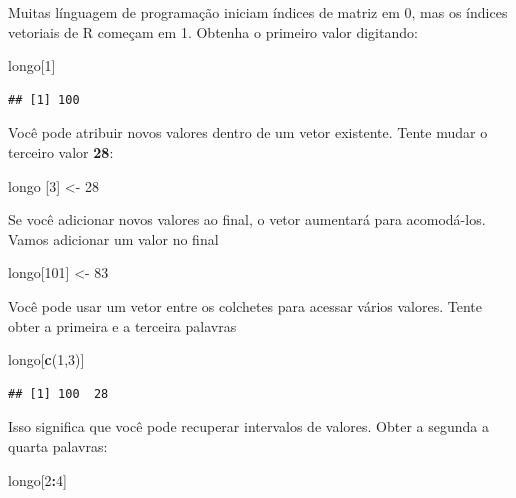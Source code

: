 \documentclass[]{book}
\newenvironment{Shaded}{\begin{snugshade}}{\end{snugshade}}
\newcommand{\DecValTok}[1]{\textcolor[rgb]{0.00,0.00,0.81}{#1}}
\newcommand{\KeywordTok}[1]{\textcolor[rgb]{0.13,0.29,0.53}{\textbf{#1}}}
\newcommand{\NormalTok}[1]{#1}
\newcommand{\OperatorTok}[1]{\textcolor[rgb]{0.81,0.36,0.00}{\textbf{#1}}}
\newcommand{\StringTok}[1]{\textcolor[rgb]{0.31,0.60,0.02}{#1}}
\begin{document}
Muitas línguagem de programação iniciam índices de matriz em 0, mas os índices vetoriais de R começam em 1. Obtenha o primeiro valor digitando:

\begin{Shaded}
\begin{Highlighting}[]
\NormalTok{longo[}\DecValTok{1}\NormalTok{]}
\end{Highlighting}
\end{Shaded}

\begin{verbatim}
## [1] 100
\end{verbatim}

Você pode atribuir novos valores dentro de um vetor existente. Tente mudar o terceiro valor \textbf{28}:

\begin{Shaded}
\begin{Highlighting}[]
\NormalTok{longo [}\DecValTok{3}\NormalTok{] <-}\StringTok{ }\DecValTok{28}
\end{Highlighting}
\end{Shaded}

Se você adicionar novos valores ao final, o vetor aumentará para acomodá-los. Vamos adicionar um valor no final

\begin{Shaded}
\begin{Highlighting}[]
\NormalTok{longo[}\DecValTok{101}\NormalTok{] <-}\StringTok{ }\DecValTok{83}
\end{Highlighting}
\end{Shaded}

Você pode usar um vetor entre os colchetes para acessar vários valores. Tente obter a primeira e a terceira palavras

\begin{Shaded}
\begin{Highlighting}[]
\NormalTok{longo[}\KeywordTok{c}\NormalTok{(}\DecValTok{1}\NormalTok{,}\DecValTok{3}\NormalTok{)]}
\end{Highlighting}
\end{Shaded}

\begin{verbatim}
## [1] 100  28
\end{verbatim}

Isso significa que você pode recuperar intervalos de valores. Obter a segunda a quarta palavras:

\begin{Shaded}
\begin{Highlighting}[]
\NormalTok{longo[}\DecValTok{2}\OperatorTok{:}\DecValTok{4}\NormalTok{]}
\end{Highlighting}
\end{Shaded}
\end{document}
